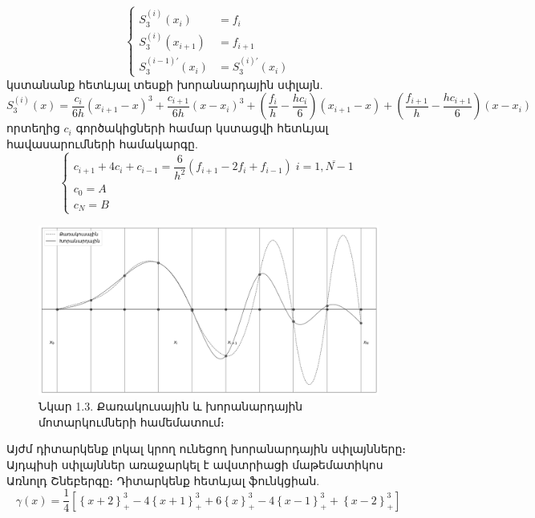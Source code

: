 \documentclass[fleqn, bachelor,subf,12pt,notitlepage]{article}
\begin{document}
\begin{equation}
\begin{cases}
				S_{3}^{(i)}(x_{i}) &=f_{i}\\
				S_{3}^{(i)}(x_{i+1}) &= f_{i+1}\\
				S_{3}^{(i-1)'}(x_{i}) &= S_{3}^{(i)'}(x_{i})

\end{cases}
\end{equation}
կստանանք հետևյալ տեսքի խորանարդային սփլայն.
\begin{equation}
	S_{3}^{(i)}(x) = \dfrac{c_{i}}{6h}\left(x_{i+1}-x\right)^{3}+\dfrac{c_{i+1}}{6h}\left(x-x_{i}\right)^{3}+\left(\dfrac{f_{i}}{h}-\dfrac{hc_{i}}{6}\right)\left(x_{i+1}-x\right)+\left(\dfrac{f_{i+1}}{h}-\dfrac{hc_{i+1}}{6}\right)\left(x-x_{i}\right)
\end{equation}
որտեղից $c_{i}$ գործակիցների համար կստացվի հետևյալ հավասարումների համակարգը.
\begin{equation}
\begin{cases}
c_{i+1}+4c_{i}+c_{i-1} = \dfrac{6}{h^2}\left(f_{i+1}-2f_{i}+f_{i-1}\right) \; i=\overline{1, N-1}\\
c_{0}=A\\
c_{N}=B
\end{cases}
\end{equation}
\begin{figure}[h!]
\centering
\includegraphics[width=1.0\textwidth]{images/quadratic_and_cubic_interploation}
\captionsetup{labelformat=empty}
\caption{Նկար 1.3. Քառակուսային և խորանարդային մոտարկումների համեմատում։}
\end{figure}
\newpage
Այժմ դիտարկենք լոկալ կրող ունեցող խորանարդային սփլայնները։ Այդպիսի սփլայններ առաջարկել է ավստրիացի մաթեմատիկոս Առնոլդ Շնեբերգը։
Դիտարկենք հետևյալ ֆունկցիան.
\begin{equation}
				\gamma(x)=\dfrac{1}{4}\left[\left\{x+2\right\}^{3}_{+} - 4\left\{x+1\right\}^{3}_{+}+ 6\left\{x\right\}^{3}_{+} -4\left\{x-1\right\}^{3}_{+} + \left\{x-2\right\}^{3}_{+}\right]
\end{equation}
\end{document}
